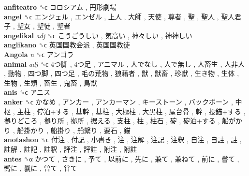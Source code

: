 \textbf{anfiteatro} ␝ϲ   コロシアム ,  円形劇場   \\
\textbf{angel} ␝ϲ   エンジェル ,  エンゼル ,  上人 ,  大師 ,  天使 ,  尊者 ,  聖 ,  聖人 ,  聖人君子 ,  聖女 ,  聖徒 ,  聖者   \\
\textbf{angelikal} \emph{adj}  ␝ϲ   こうごうしい ,  気高い ,  神々しい ,  神神しい   \\
\textbf{anglikano} ␝ϲ   英国国教会派 ,  英国国教徒   \\
\textbf{Angola} \emph{n}  ␝ϲ   アンゴラ   \\
\textbf{animal} \emph{adj}  ␝ϲ   4つ脚 ,  4つ足 ,  アニマル ,  人でなし ,  人で無し ,  人畜生 ,  人非人 ,  動物 ,  四つ脚 ,  四つ足 ,  毛の荒物 ,  狼藉者 ,  獣 ,  獣畜 ,  珍獣 ,  生き物 ,  生体 ,  生物 ,  生類 ,  畜生 ,  鬼畜 ,  鳥獣   \\
\textbf{anis} ␝ϲ   アニス   \\
\textbf{anker} ␝ϲ   かなめ ,  アンカー ,  アンカーマン ,  キーストーン ,  バックボーン ,  中枢 ,  主柱 ,  停泊+する ,  基幹 ,  基柱 ,  大極柱 ,  大黒柱 ,  屋台骨 ,  幹 ,  投錨+する ,  拠りどころ ,  拠り所 ,  拠所 ,  据える ,  支柱 ,  柱 ,  柱石 ,  碇 ,  碇泊+する ,  船がかり ,  船掛かり ,  船掛り ,  船繋り ,  要石 ,  錨   \\
\textbf{anotashon} ␝ϲ   付注 ,  付記 ,  小書き ,  注 ,  注解 ,  注記 ,  注釈 ,  自注 ,  自註 ,  註 ,  註解 ,  註記 ,  註釈 ,  評注 ,  評註 ,  附注 ,  附註   \\
\textbf{antes} ␝α   かつて ,  さきに ,  予て ,  以前に ,  先に ,  兼て ,  兼ねて ,  前に ,  嘗て ,  嚮に ,  曩に ,  曽て ,  甞て   \\
